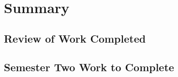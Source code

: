 \section{Summary}
	\subsection{Review of Work Completed}
	\subsection{Semester Two Work to Complete}